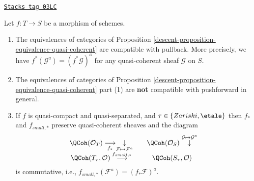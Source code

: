 \begin{proposition}
\label{descent-proposition-equivalence-quasi-coherent-functorial}
\href{https://stacks.math.columbia.edu/tag/03LC}{\texttt{Stacks tag 03LC}}

Let $f : T \to S$ be a morphism of schemes.
\begin{enumerate}
\item The equivalences of categories of
Proposition \ref{descent-proposition-equivalence-quasi-coherent}
are compatible with pullback.
More precisely, we have $f^*(\mathcal{G}^a) = (f^*\mathcal{G})^a$
for any quasi-coherent sheaf $\mathcal{G}$ on $S$.
\item The equivalences of categories of
Proposition \ref{descent-proposition-equivalence-quasi-coherent} part (1)
are {\bf not} compatible with pushforward in general.
\item If $f$ is quasi-compact and quasi-separated, and
$\tau \in \{Zariski, \etale\}$ then $f_*$ and $f_{small, *}$
preserve quasi-coherent sheaves and the diagram
$$
\begin{array}{ccc}\QCoh(\mathcal{O}_T)
\underset{f_*}{\longrightarrow}\underset{\mathcal{F} \mapsto \mathcal{F}^a}{\downarrow} &  & \QCoh(\mathcal{O}_S)
\overset{\mathcal{G} \mapsto \mathcal{G}^a}{\downarrow} \\ \QCoh(T_\tau, \mathcal{O}) \overset{f_{small, *}}{\longrightarrow} &  & \QCoh(S_\tau, \mathcal{O})\end{array}
$$
is commutative, i.e., $f_{small, *}(\mathcal{F}^a) = (f_*\mathcal{F})^a$.
\end{enumerate}
\end{proposition}


